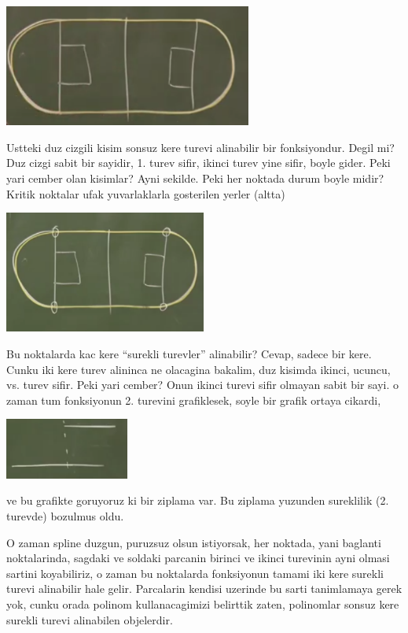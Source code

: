 \documentclass[12pt,fleqn]{article}\usepackage{common}
\begin{document}
\includegraphics[height=4cm]{spline6.png}

Ustteki duz cizgili kisim sonsuz kere turevi alinabilir bir
fonksiyondur. Degil mi? Duz cizgi sabit bir sayidir, 1. turev sifir, ikinci
turev yine sifir, boyle gider. Peki yari cember olan kisimlar? Ayni
sekilde. Peki her noktada durum boyle midir? Kritik noktalar ufak yuvarlaklarla
gosterilen yerler (altta)

\includegraphics[height=4cm]{spline7.png}

Bu noktalarda kac kere ``surekli turevler'' alinabilir? Cevap, sadece bir
kere. Cunku iki kere turev alininca ne olacagina bakalim, duz kisimda
ikinci, ucuncu, vs. turev sifir. Peki yari cember? Onun ikinci turevi sifir
olmayan sabit bir sayi. o zaman tum fonksiyonun 2. turevini grafiklesek,
soyle bir grafik ortaya cikardi,

\includegraphics[height=2cm]{spline8.png}

ve bu grafikte goruyoruz ki bir ziplama var. Bu ziplama yuzunden sureklilik
(2. turevde) bozulmus oldu.

O zaman spline duzgun, puruzsuz olsun istiyorsak, her noktada, yani
baglanti noktalarinda, sagdaki ve soldaki parcanin birinci ve ikinci
turevinin ayni olmasi sartini koyabiliriz, o zaman bu noktalarda
fonksiyonun tamami iki kere surekli turevi alinabilir hale
gelir. Parcalarin kendisi uzerinde bu sarti tanimlamaya gerek yok, cunku
orada polinom kullanacagimizi belirttik zaten, polinomlar sonsuz kere
surekli turevi alinabilen objelerdir. 
\end{document}
